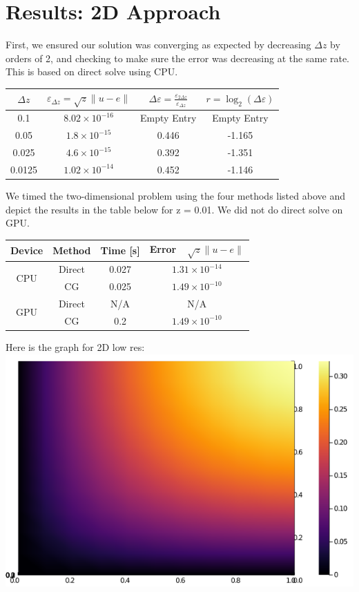 \documentclass[11pt]{article}
\begin{document}
	\section{Results: 2D Approach}
	First, we ensured our solution was converging as expected by decreasing $ \Delta z $ by orders of 2, and checking to make sure the error was decreasing at the same rate. This is based on direct solve using CPU.
		\begin{center}
		\renewcommand{\arraystretch}{2.0}
		\begin{tabular}{c|c|c|c}
			\hline\hline
			$\displaystyle \Delta z $&$\displaystyle \varepsilon_{\Delta z} = \sqrt{z}\lVert u-e\rVert $&$ \displaystyle \Delta\varepsilon = \frac{\varepsilon_{2\Delta z}}{\varepsilon_{\Delta z}} $&$\displaystyle r = \log_2\left(\Delta\varepsilon\right) $\\
			\hline
			0.1&$8.02\times 10^{-16}$&Empty Entry&Empty Entry\\
			0.05&$1.8\times 10^{-15}$ &0.446&-1.165\\
			0.025&$4.6\times 10^{-15}$&0.392&-1.351\\
			0.0125&$1.02\times 10^{-14}$&0.452&-1.146\\
			\hline
		\end{tabular}
	\end{center}
	We timed the two-dimensional problem using the four methods listed above and depict the results in the table below for \Delta z = 0.01. We did not do direct solve on GPU.
	\begin{center}
		\renewcommand{\arraystretch}{1.5}
		\begin{tabular}{c|c|c|c}
			\hline\hline
			\textbf{Device}&\textbf{Method}&\textbf{Time [s]}&\textbf{Error~~$\sqrt{z}\lVert u-e\rVert $}\\
			\hline
			\multirow{2}{*}{CPU}&Direct&0.027&$1.31\times 10^{-14}$\\
			&CG&0.025&$1.49\times 10^{-10}$\\
			\hline
			\multirow{2}{*}{GPU}&Direct&N/A&N/A\\
			&CG&0.2&$1.49\times 10^{-10}$\\
			\hline
		\end{tabular}
	\end{center}
	
	Here is the graph for 2D low res:\\
	\includegraphics[scale=0.5]{2D_low_res.png}
	
\end{document}
